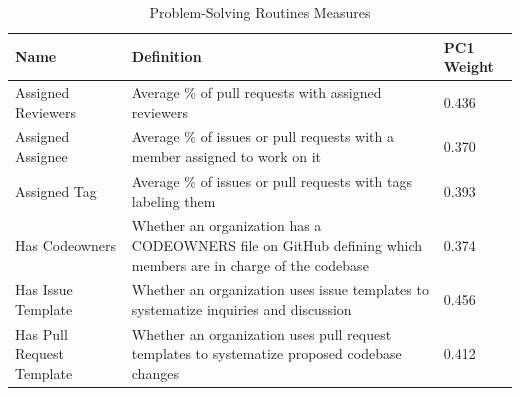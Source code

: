 \begin{longtable}{>{\raggedright\arraybackslash}p{} p{}p{}}
\caption{Problem-Solving Routines Measures}\label{tab:problem_solving_routines_metrics}\\
\toprule
\textbf{Name} & \textbf{Definition} & \textbf{PC1 Weight} \\
\midrule
\endfirsthead

\bottomrule
\endlastfoot

Assigned Reviewers & Average \% of pull requests with assigned reviewers & 0.436 \\
Assigned Assignee & Average \% of issues or pull requests with a member assigned to work on it & 0.370 \\
Assigned Tag & Average \% of issues or pull requests with tags labeling them  & 0.393 \\
Has Codeowners & Whether an organization has a CODEOWNERS file on GitHub defining which members are in charge of the codebase & 0.374 \\
Has Issue Template & Whether an organization uses issue templates to systematize inquiries and discussion  & 0.456 \\
Has Pull Request Template & Whether an organization uses pull request templates to systematize proposed codebase changes  & 0.412 \\
\end{longtable}
